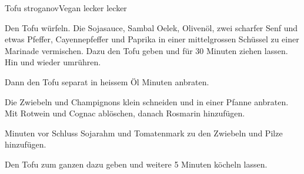 
\begin{recipe}[]{Tofu stroganov}{Vegan lecker lecker}{}



\step
Den Tofu w\"urfeln. Die Sojasauce, Sambal Oelek, Oliven\"ol, zwei \TL scharfer Senf und etwas Pfeffer, Cayennepfeffer und Paprika in einer mittelgrossen Sch\"ussel zu einer Marinade vermischen. Dazu den Tofu geben und f\"ur 30 Minuten ziehen lassen. Hin und wieder umr\"uhren.

\step
Dann den Tofu separat in heissem \"Ol  Minuten anbraten.

\step
Die Zwiebeln und Champignons klein schneiden und in einer Pfanne anbraten. Mit Rotwein und Cognac abl\"oschen, danach Rosmarin hinzuf\"ugen.

 Minuten vor Schluss Sojarahm und Tomatenmark zu den Zwiebeln und Pilze hinzuf\"ugen.

\step
Den Tofu zum ganzen dazu geben und weitere 5 Minuten k\"ocheln lassen.



\end{recipe}
